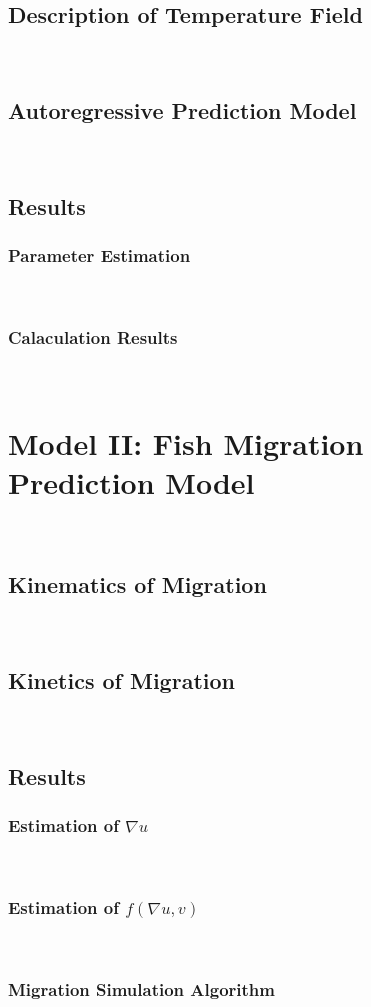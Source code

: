 \documentclass{mcmthesis}
\begin{document}
\subsection{Description of Temperature Field}
\ 
\indent \lipsum[17]
\subsection{Autoregressive Prediction Model}
\ 
\indent \lipsum[18]
\subsection{Results}
\subsubsection{Parameter Estimation}
\ 
\indent \lipsum[19]
\subsubsection{Calaculation Results}
\ 
\indent \lipsum[20]

\section{Model II: Fish Migration Prediction Model}
\ 
\indent \lipsum[21]
\subsection{Kinematics of Migration}
\ 
\indent \lipsum[22]
\subsection{Kinetics of Migration}
\ 
\indent \lipsum[23]
\subsection{Results}
\subsubsection{Estimation of $\nabla u$}
\ 
\indent \lipsum[24]
\subsubsection{Estimation of $f(\nabla u, v)$}
\ 
\indent \lipsum[25]
\subsubsection{Migration Simulation Algorithm}
\ 
\indent \lipsum[26]
\end{document}
